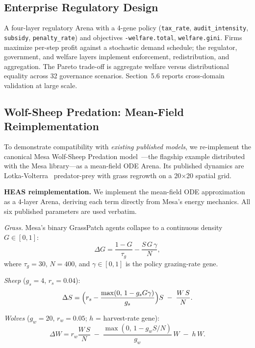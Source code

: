 \documentclass{wscpaperproc}
\begin{document}
\subsection{Enterprise Regulatory Design}

A four-layer regulatory Arena with a 4-gene policy
(\texttt{tax\_rate}, \texttt{audit\_intensity}, \texttt{subsidy},
\texttt{penalty\_rate}) and objectives \texttt{-welfare.total},
\texttt{welfare.gini}. Firms maximize per-step profit against a stochastic
demand schedule; the regulator, government, and welfare layers implement
enforcement, redistribution, and aggregation. The Pareto trade-off is
aggregate welfare versus distributional equality across 32 governance scenarios.
Section~5.6 reports cross-domain validation at large scale.

\subsection{Wolf-Sheep Predation: Mean-Field Reimplementation}
\label{sec:wolfsheep}

To demonstrate compatibility with \emph{existing published models}, we
re-implement the canonical Mesa Wolf-Sheep Predation model~\cite{wilensky1997wolfsheep,kazil2020mesa}---the flagship example distributed with the Mesa library---as a mean-field ODE Arena.
Its published dynamics are Lotka-Volterra~\cite{lotka1925elements,volterra1926variazioni} predator-prey with grass regrowth on a
20$\times$20 spatial grid.

\textbf{HEAS reimplementation.} We implement the mean-field ODE approximation as a
4-layer Arena, deriving each term directly from Mesa's energy mechanics.
All six published parameters are used verbatim.

\textit{Grass.} Mesa's binary GrassPatch agents collapse to a continuous
density $G\in[0,1]$:
\begin{equation}
  \Delta G = \frac{1-G}{\tau_g} - \frac{S\,G\,\gamma}{N},
  \label{eq:grass}
\end{equation}
where $\tau_g\!=\!30$, $N\!=\!400$, and $\gamma\!\in\![0,1]$ is the policy
grazing-rate gene.

\textit{Sheep} ($g_s\!=\!4$, $r_s\!=\!0.04$):
\begin{equation}
  \Delta S = \Bigl(r_s - \frac{\max(0,\,1-g_s G\gamma)}{g_s}\Bigr)S
             \;-\; \frac{W\,S}{N}.
  \label{eq:sheep}
\end{equation}

\textit{Wolves} ($g_w\!=\!20$, $r_w\!=\!0.05$; $h$ = harvest-rate gene):
\begin{equation}
  \Delta W = r_w \frac{W\,S}{N}
             \;-\; \frac{\max(0,\,1-g_w S/N)}{g_w}\,W
             \;-\; h\,W.
  \label{eq:wolf}
\end{equation}
\end{document}
